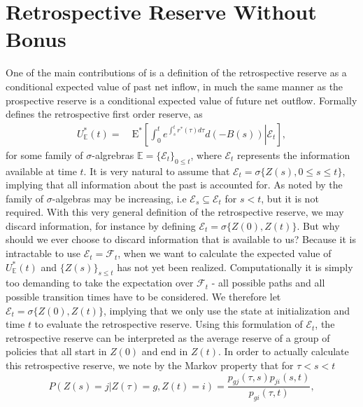 \documentclass[12pt]{article}
\newcommand{\E}{\text{E}}
\newcommand{\indic}[1]{\mathds{1}_{ \{ #1 \} }}
\theoremstyle{my_thm}
\theoremstyle{my_rem}
\begin{document}
\section{Retrospective Reserve Without Bonus} \label{sec:Nor}
One of the main contributions of \citet{Norberg} is a definition of the retrospective reserve as a conditional expected value of past net inflow, in much the same manner as the prospective reserve is a conditional expected value of future net outflow. Formally \citet{Norberg} defines the retrospective first order reserve, as
\begin{align*}
U^*_\mathbb{E}(t)= \ &\E^*  \left. \left[ \int_0^t e^{\int_s^t r^*(\tau) d\tau} d(-B(s)) \right| \mathcal{E}_t \right], 
\end{align*} 
for some family of $\sigma$-algrebras $\mathbb{E}=\{\mathcal{E}_t \}_{0\leq t}$, where $\mathcal{E}_t$ represents the information available at time $t$. It is very natural to assume that $\mathcal{E}_t=\sigma\{ Z(s), 0 \leq s\leq t \}$, implying that all information about the past is accounted for. As noted by \citet{Norberg} the family of $\sigma$-algebras may be increasing, i.e $\mathcal{E}_s \subseteq \mathcal{E}_t$ for $s<t$, but it is not required. With this very general definition of the retrospective reserve, we may discard information, for instance by defining $\mathcal{E}_t=\sigma \{Z(0), Z(t) \}$. But why should we ever choose to discard information that is available to us? Because it is intractable to use $\mathcal{E}_t=\mathcal{F}_t$, when we want to calculate the expected value of $U^*_\mathbb{E}(t)$ and $\{ Z(s) \}_{s\leq t}$ has not yet been realized. Computationally it is simply too demanding to take the expectation over $\mathcal{F}_t$ - all possible paths and all possible transition times have to be considered. We therefore let $\mathcal{E}_t=\sigma \{Z(0), Z(t) \}$, implying that we only use the state at initialization and time $t$ to evaluate the retrospective reserve. Using this formulation of $\mathcal{E}_t$, the retrospective reserve can be interpreted as the average reserve of a group of policies that all start in $Z(0)$ and end in $Z(t)$. In order to actually calculate this retrospective reserve, we note by the Markov property that for $\tau < s < t$
\begin{equation}
P(Z(s)=j| Z(\tau)=g, Z(t)=i )=\frac{p_{gj}(\tau,s)p_{ji}(s,t)}{p_{gi}(\tau,t)},
\label{eq:AAM}
\end{equation}
\end{document}
